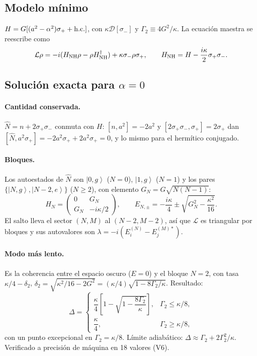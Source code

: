 \documentclass[11pt]{report}
\newcommand{\ket}[1]{\left|#1\right\rangle}
\newcommand{\spl}{\sigma_{+}}
\newcommand{\smi}{\sigma_{-}}
\newcommand{\D}{\mathcal{D}}
\newcommand{\Lv}{\mathcal{L}}
\begin{document}
\subsection{Modelo m\'inimo}

$H=G[(a^{2}-\alpha^{2})\spl+{\rm h.c.}]$, con $\kappa\D[\smi]$ y $\Gamma_{2}\equiv4G^{2}/\kappa$. La ecuaci\'on maestra se reescribe como
\begin{equation}
\Lv\rho=-i(H_{\rm NH}\rho-\rho H_{\rm NH}^{\dagger})+\kappa\smi\rho\spl,\qquad H_{\rm NH}=H-\frac{i\kappa}{2}\spl\smi.
\end{equation}

\subsection{Soluci\'on exacta para $\alpha=0$}

\paragraph{Cantidad conservada.} $\hat N=n+2\spl\smi$ conmuta con $H$: $[n,a^{2}]=-2a^{2}$ y $[2\spl\smi,\spl]=2\spl$ dan $[\hat N,a^{2}\spl]=-2a^{2}\spl+2a^{2}\spl=0$, y lo mismo para el herm\'itico conjugado.

\paragraph{Bloques.} Los autoestados de $\hat N$ son $\ket{0,g}$ ($N=0$), $\ket{1,g}$ ($N=1$) y los pares $\{\ket{N,g},\ket{N-2,e}\}$ ($N\geq2$), con elemento $G_{N}=G\sqrt{N(N-1)}$:
\begin{equation}
H_{N}=\begin{pmatrix}0&G_{N}\\G_{N}&-i\kappa/2\end{pmatrix},\qquad E_{N,\pm}=-\frac{i\kappa}{4}\pm\sqrt{G_{N}^{2}-\frac{\kappa^{2}}{16}}.
\end{equation}
El salto lleva el sector $(N,M)$ al $(N-2,M-2)$, as\'i que $\Lv$ es triangular por bloques y sus autovalores son $\lambda=-i(E_{i}^{(N)}-E_{j}^{(M)*})$.

\paragraph{Modo m\'as lento.} Es la coherencia entre el espacio oscuro ($E=0$) y el bloque $N=2$, con tasa $\kappa/4-\delta_{2}$, $\delta_{2}=\sqrt{\kappa^{2}/16-2G^{2}}=(\kappa/4)\sqrt{1-8\Gamma_{2}/\kappa}$. Resultado:
\begin{equation}
\boxed{\Delta=\begin{cases}\dfrac{\kappa}{4}\left[1-\sqrt{1-\dfrac{8\Gamma_{2}}{\kappa}}\right],&\Gamma_{2}\leq\kappa/8,\\[2ex]\dfrac{\kappa}{4},&\Gamma_{2}\geq\kappa/8,\end{cases}}
\end{equation}
con un punto excepcional en $\Gamma_{2}=\kappa/8$. L\'imite adiab\'atico: $\Delta\approx\Gamma_{2}+2\Gamma_{2}^{2}/\kappa$. Verificado a precisi\'on de m\'aquina en 18 valores (V6).
\end{document}
